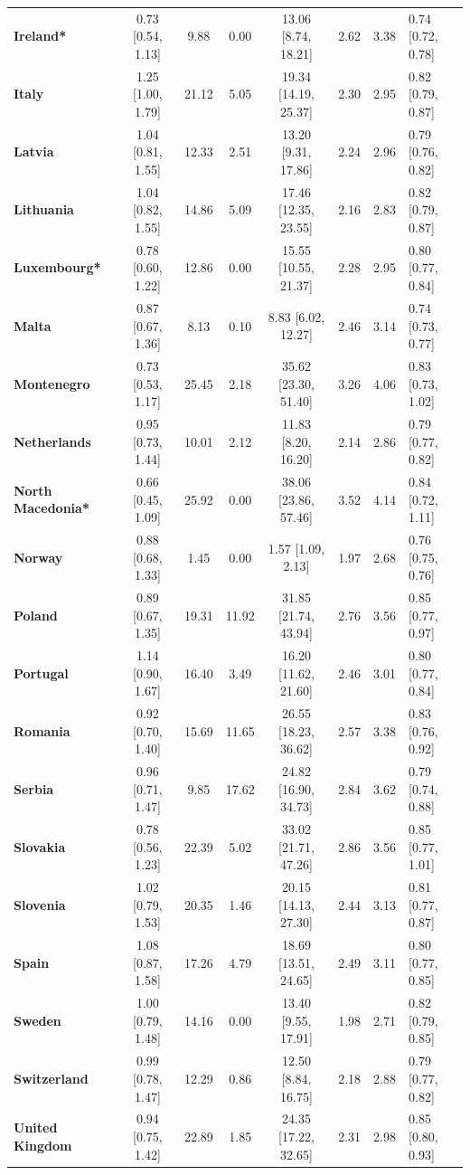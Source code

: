 \begin{table}
\begin{tabular}{lcccc}
\textbf{Ireland*} & 0.73 [0.54, 1.13] & 9.88 & 0.00 & 13.06 [8.74, 18.21] & 2.62 & 3.38 & 0.74 [0.72, 0.78] \\
\textbf{Italy} & 1.25 [1.00, 1.79] & 21.12 & 5.05 & 19.34 [14.19, 25.37] & 2.30 & 2.95 & 0.82 [0.79, 0.87] \\
\textbf{Latvia} & 1.04 [0.81, 1.55] & 12.33 & 2.51 & 13.20 [9.31, 17.86] & 2.24 & 2.96 & 0.79 [0.76, 0.82] \\
\textbf{Lithuania} & 1.04 [0.82, 1.55] & 14.86 & 5.09 & 17.46 [12.35, 23.55] & 2.16 & 2.83 & 0.82 [0.79, 0.87] \\
\textbf{Luxembourg*} & 0.78 [0.60, 1.22] & 12.86 & 0.00 & 15.55 [10.55, 21.37] & 2.28 & 2.95 & 0.80 [0.77, 0.84] \\
\textbf{Malta} & 0.87 [0.67, 1.36] & 8.13 & 0.10 & 8.83 [6.02, 12.27] & 2.46 & 3.14 & 0.74 [0.73, 0.77] \\
\textbf{Montenegro} & 0.73 [0.53, 1.17] & 25.45 & 2.18 & 35.62 [23.30, 51.40] & 3.26 & 4.06 & 0.83 [0.73, 1.02] \\
\textbf{Netherlands} & 0.95 [0.73, 1.44] & 10.01 & 2.12 & 11.83 [8.20, 16.20] & 2.14 & 2.86 & 0.79 [0.77, 0.82] \\
\textbf{North Macedonia*} & 0.66 [0.45, 1.09] & 25.92 & 0.00 & 38.06 [23.86, 57.46] & 3.52 & 4.14 & 0.84 [0.72, 1.11] \\
\textbf{Norway} & 0.88 [0.68, 1.33] & 1.45 & 0.00 & 1.57 [1.09, 2.13] & 1.97 & 2.68 & 0.76 [0.75, 0.76] \\
\textbf{Poland} & 0.89 [0.67, 1.35] & 19.31 & 11.92 & 31.85 [21.74, 43.94] & 2.76 & 3.56 & 0.85 [0.77, 0.97] \\
\textbf{Portugal} & 1.14 [0.90, 1.67] & 16.40 & 3.49 & 16.20 [11.62, 21.60] & 2.46 & 3.01 & 0.80 [0.77, 0.84] \\
\textbf{Romania} & 0.92 [0.70, 1.40] & 15.69 & 11.65 & 26.55 [18.23, 36.62] & 2.57 & 3.38 & 0.83 [0.76, 0.92] \\
\textbf{Serbia} & 0.96 [0.71, 1.47] & 9.85 & 17.62 & 24.82 [16.90, 34.73] & 2.84 & 3.62 & 0.79 [0.74, 0.88] \\
\textbf{Slovakia} & 0.78 [0.56, 1.23] & 22.39 & 5.02 & 33.02 [21.71, 47.26] & 2.86 & 3.56 & 0.85 [0.77, 1.01] \\
\textbf{Slovenia} & 1.02 [0.79, 1.53] & 20.35 & 1.46 & 20.15 [14.13, 27.30] & 2.44 & 3.13 & 0.81 [0.77, 0.87] \\
\textbf{Spain} & 1.08 [0.87, 1.58] & 17.26 & 4.79 & 18.69 [13.51, 24.65] & 2.49 & 3.11 & 0.80 [0.77, 0.85] \\
\textbf{Sweden} & 1.00 [0.79, 1.48] & 14.16 & 0.00 & 13.40 [9.55, 17.91] & 1.98 & 2.71 & 0.82 [0.79, 0.85] \\
\textbf{Switzerland} & 0.99 [0.78, 1.47] & 12.29 & 0.86 & 12.50 [8.84, 16.75] & 2.18 & 2.88 & 0.79 [0.77, 0.82] \\
\textbf{United Kingdom} & 0.94 [0.75, 1.42] & 22.89 & 1.85 & 24.35 [17.22, 32.65] & 2.31 & 2.98 & 0.85 [0.80, 0.93] \\
\bottomrule
\end{tabular}
\end{table}
